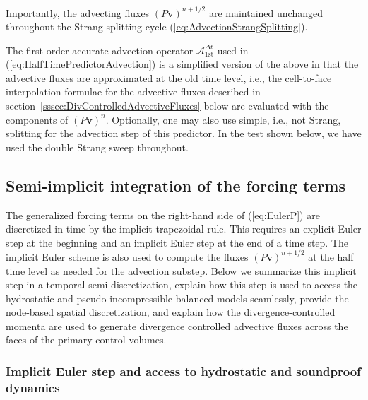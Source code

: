 \documentclass{ametsoc}
\theoremstyle{definition}
\newcommand{\eq}[1]{(\ref{#1})}
\newcommand{\vect}[1]{{\mathbf{#1}}}
\newcommand{\vv}{\vect{v}}
\newcommand{\half}{1/2}
\newcommand{\dt}{\Delta t}
\begin{document}
Importantly, the advecting fluxes $(P\vv)^{n+\half}$ are maintained unchanged 
throughout the Strang splitting cycle \eq{eq:AdvectionStrangSplitting}.

The first-order accurate advection operator $\mathcal{A}_{1\text{st}}^{\dt}$
used in \eq{eq:HalfTimePredictorAdvection} is a simplified version
of the above in that the advective fluxes are approximated at the old time level,
i.e., the cell-to-face interpolation formulae for the advective fluxes described
in section~\ref{sssec:DivControlledAdvectiveFluxes} below are evaluated with the
components of $(P\vv)^n$. Optionally, one may also use simple, i.e., not Strang, 
splitting for the advection step of this predictor. In the test shown below, 
we have used the double Strang sweep throughout. 


\subsection{Semi-implicit integration of the forcing terms}
\label{ssec:SemiImplicitForcing}

The generalized forcing terms on the right-hand side of \eq{eq:EulerP} are 
discretized in time by the implicit trapezoidal rule. This requires an explicit 
Euler step at the beginning and an implicit Euler step at the end of a time step. 
The implicit Euler scheme is also used to compute the fluxes $(P\vv)^{n+\half}$ 
at the half time level as needed for the advection substep. Below we summarize this 
implicit step in a temporal semi-discretization, explain how this step is used
to access the hydrostatic and pseudo-incompressible balanced models seamlessly, 
provide the node-based spatial discretization, and explain how the 
divergence-controlled momenta are used to generate divergence controlled advective 
fluxes across the faces of the primary control volumes.


\subsubsection{Implicit Euler step and access to hydrostatic and soundproof dynamics}
\label{sssec:ImplicitEuler}
\end{document}
